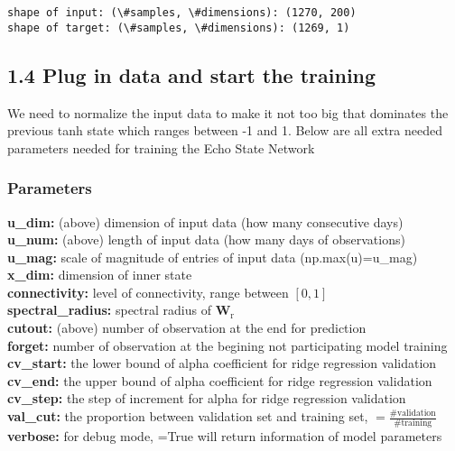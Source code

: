\documentclass[11pt]{article}
\begin{document}
    \begin{Verbatim}[commandchars=\\\{\}]
shape of input: (\#samples, \#dimensions): (1270, 200)
shape of target: (\#samples, \#dimensions): (1269, 1)

    \end{Verbatim}

    \subsection{1.4 Plug in data and start the
training}\label{plug-in-data-and-start-the-training}

We need to normalize the input data to make it not too big that
dominates the previous tanh state which ranges between -1 and 1. Below
are all extra needed parameters needed for training the Echo State
Network

\subsubsection{Parameters}\label{parameters}

\textbf{u\_dim:} (above) dimension of input data (how many consecutive
days)\\
\textbf{u\_num:} (above) length of input data (how many days of
observations)\\
\textbf{u\_mag:} scale of magnitude of entries of input data
(np.max(u)=u\_mag)\\
\textbf{x\_dim:} dimension of inner state\\
\textbf{connectivity:} level of connectivity, range between \([0,1]\)\\
\textbf{spectral\_radius:} spectral radius of
\(\mathbf{W}_{\text{r}}\)\\
\textbf{cutout:} (above) number of observation at the end for
prediction\\
\textbf{forget:} number of observation at the begining not participating
model training\\
\textbf{cv\_start:} the lower bound of alpha coefficient for ridge
regression validation\\
\textbf{cv\_end:} the upper bound of alpha coefficient for ridge
regression validation\\
\textbf{cv\_step:} the step of increment for alpha for ridge regression
validation\\
\textbf{val\_cut:} the proportion between validation set and training
set, \(=\frac{\# \text{validation}}{\# \text{training}}\)\\
\textbf{verbose:} for debug mode, =True will return information of model
parameters
\end{document}
